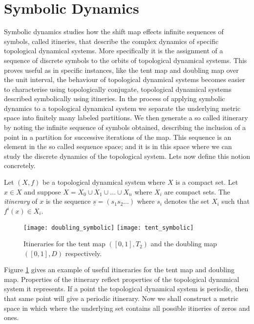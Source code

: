 \section{Symbolic Dynamics} \label{sec:symbolic-dynamics}
Symbolic dynamics studies how the shift map effects infinite sequences of symbols, called itineries, that describe the complex dynamics of specific topological dynamical systems. More specifically it is the assignment of a sequence of discrete symbols to the orbits of topological dynamical systems. This proves useful as in specific instances, like the tent map and doubling map over the unit interval, the behaviour of topological dynamical systems becomes easier to characterise using topologically conjugate, topological dynamical systems described symbolically using itineries. In the process of applying symbolic dynamics to a topological dynamical system we separate the underlying metric space into finitely many labeled partitions. We then generate a so called itinerary by noting the infinite sequence of symbols obtained, describing the inclusion of a point in a partition for successive iterations of the map. This sequence is an element in the so called sequence space; and it is in this space where we can study the discrete dynamics of the topological system. Lets now define this notion concretely.

\begin{defn}[Itinerary] \label{defn:itinerary}
    Let $(X, f)$ be a topological dynamical system where $X$ is a compact set. Let $x \in X$ and suppose $X = X_0 \cup X_1 \cup \dots \cup X_n$ where $X_i$ are compact sets. The \emph{itinerary} of $x$ is the sequence $\underline{s} = (s_1s_2\dots)$ where $s_i$ denotes the set $X_i$ such that $f^i(x) \in X_i$.
\end{defn}

\begin{figure}[h]
    \centering
    \texttt{[image: doubling\_symbolic]}
    \texttt{[image: tent\_symbolic]}
    \caption{Itineraries for the tent map $([0, 1], T_2)$ and the doubling map $([0, 1], D)$ respectively.}
    \label{fig:symbolic}
\end{figure}

Figure \ref{fig:symbolic} gives an example of useful itineraries for the tent map and doubling map. Properties of the itinerary reflect properties of the topological dynamical system it represents. If a point the topological dynamical system is periodic, then that same point will give a periodic itinerary. Now we shall construct a metric space in which where the underlying set contains all possible itineries of zeros and ones.

